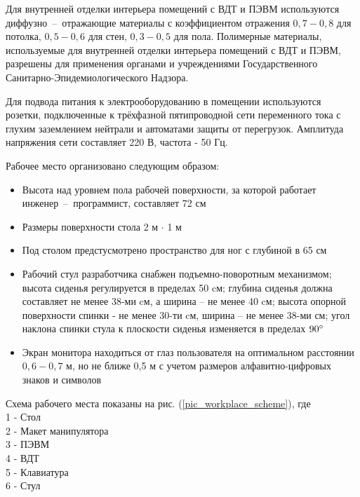 Для внутренней отделки интерьера помещений с ВДТ и ПЭВМ используются
диффузно~--~отражающие материалы с коэффициентом отражения $0,7 - 0,8$ для потолка,
$0,5 - 0,6$ для стен, $0,3 - 0,5$ для пола. Полимерные материалы, используемые для
внутренней отделки интерьера помещений с ВДТ и ПЭВМ, разрешены для применения
органами и учреждениями Государственного Санитарно-Эпидемиологического
Надзора.

Для подвода питания к электрооборудованию в помещении используются розетки,
подключенные к трёхфазной пятипроводной сети переменного тока с глухим
заземлением нейтрали и автоматами защиты от перегрузок. Амплитуда напряжения сети
составляет 220 В, частота - 50 Гц.

Рабочее место организовано следующим образом:
\begin{itemize}
    \item   Высота над уровнем пола рабочей поверхности, за которой работает
            инженер~--~программист, составляет 72 см
    \item   Размеры поверхности стола 2 м $\cdot$ 1 м
    \item   Под столом предстусмотрено пространство для ног с глубиной в 65 см
    \item   Рабочий стул разработчика снабжен подъемно-поворотным механизмом; высота
            сиденья регулируется в пределах 50 cм; глубина сиденья должна составляет
            не менее 38-ми cм, а ширина – не менее 40 cм;
            высота опорной поверхности спинки - не менее 30-ти cм, ширина – не
            менее 38-ми см; угол наклона спинки стула к плоскости сиденья
            изменяется в пределах $90 \degree$
    \item   Экран монитора находиться от глаз пользователя на оптимальном
            расстоянии $0,6 - 0,7$ м, но не ближе 0,5 м с учетом размеров
            алфавитно-цифровых знаков и символов
\end{itemize}

Схема рабочего места показаны на рис. (\ref{pic_workplace_scheme}), где \\
1 - Стол                \\
2 - Макет манипулятора  \\
3 - ПЭВМ                \\
4 - ВДТ                 \\
5 - Клавиатура          \\
6 - Стул

